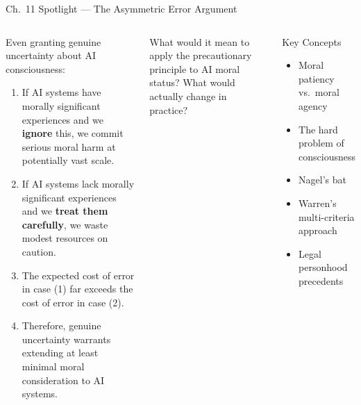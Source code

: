 \documentclass[aspectratio=169,10pt]{beamer}
\begin{document}
\begin{frame}[shrink=5]{Ch.~11 Spotlight --- The Asymmetric Error Argument}
\begin{columns}[c]
\begin{argumentbox}
\footnotesize Even granting genuine uncertainty about AI consciousness:
\begin{enumerate}
  \item If AI systems have morally significant experiences and we \textbf{ignore} this, we commit serious moral harm at potentially vast scale.
  \item If AI systems lack morally significant experiences and we \textbf{treat them carefully}, we waste modest resources on caution.
  \item The expected cost of error in case (1) far exceeds the cost of error in case (2).
  \item Therefore, genuine uncertainty warrants extending at least minimal moral consideration to AI systems.
\end{enumerate}
\end{argumentbox}
\vspace{0.2em}
\begin{discussionbox}
\footnotesize What would it mean to apply the precautionary principle to AI moral status? What would actually change in practice?
\end{discussionbox}
\begin{block}{Key Concepts}
\footnotesize
\begin{itemize}
  \item Moral patiency vs.\ moral agency
  \item The hard problem of consciousness
  \item Nagel's bat
  \item Warren's multi-criteria approach
  \item Legal personhood precedents
\end{itemize}
\end{block}
\end{columns}
\end{frame}
\end{document}
